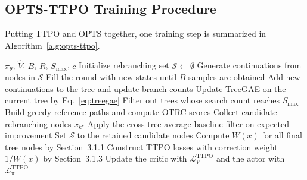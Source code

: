 \subsection{OPTS-TTPO Training Procedure}

Putting TTPO and OPTS together, one training step is summarized in Algorithm~\ref{alg:opts-ttpo}.

\begin{algorithm}[t]
\caption{OPTS-TTPO training step}
\label{alg:opts-ttpo}
\begin{algorithmic}[1]
\Require $\pi_\theta$, $\hat V$, $B$, $R$, $S_{\max}$, $c$
\State Initialize rebranching set $\mathcal{S}\leftarrow\emptyset$
    \State Generate continuations from nodes in $\mathcal{S}$
    \State Fill the round with new states until $B$ samples are obtained
    \State Add new continuations to the tree and update branch counts
    \State Update TreeGAE on the current tree by Eq.~\eqref{eq:treegae}
        \State Filter out trees whose search count reaches $S_{\max}$
        \State Build greedy reference paths and compute OTRC scores
        \State Collect candidate rebranching nodes $x_{k^\star}$
        \State Apply the cross-tree average-baseline filter on expected improvement
        \State Set $\mathcal{S}$ to the retained candidate nodes
    \EndIf
\EndFor
\State Compute $W(x)$ for all final tree nodes by Section~3.1.1
\State Construct TTPO losses with correction weight $1/W(x)$ by Section~3.1.3
\State Update the critic with $\mathcal{L}_V^{\mathrm{TTPO}}$ and the actor with $\mathcal{L}_\pi^{\mathrm{TTPO}}$
\end{algorithmic}
\end{algorithm}
